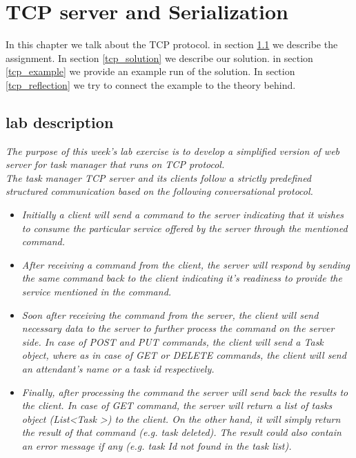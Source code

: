 \chapter{TCP server and Serialization}
\minitoc

In this chapter we talk about the TCP protocol. in section \ref{tcp_lab} we describe the assignment. In section \ref{tcp_solution} we describe our solution. in section \ref{tcp_example} we provide an example run of the solution. In section \ref{tcp_reflection} we try to connect the example to the theory behind. 

\section{lab description}
\label{tcp_lab}
\textit{The purpose of this week’s lab exercise is to develop a simplified version of web server for task manager that runs on TCP protocol.}\\

\textit{The task manager TCP server and its clients follow a strictly predefined structured communication based on the following conversational protocol.}

\begin{itemize}
\item \textit{Initially a client will send a command to the server indicating that it wishes to consume the particular service offered by the server through the mentioned command.}\\

\item \textit{After receiving a command from the client, the server will respond by sending the same command back to the client indicating it’s readiness to provide the service mentioned in the command.}\\

\item \textit{Soon after receiving the command from the server, the client will send necessary data to the server to further process the command on the server side. In case of POST and PUT commands, the client will send a Task object, where as in case of GET or DELETE commands, the client will send an attendant’s name or a task id respectively.}\\

\item \textit{Finally, after processing the command the server will send back the results to the client. In case of GET command, the server will return a list of tasks object (List\textless Task \textgreater) to the client. On the other hand, it will simply return the result of that command (e.g. task deleted). The result could also contain an error message if any (e.g. task Id not found in the task list).}
\end{itemize}


